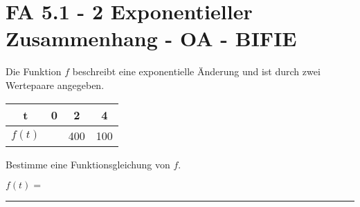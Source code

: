 \section{FA 5.1 - 2 Exponentieller Zusammenhang - OA - BIFIE}


\begin{beispiel}[FA 5.1]{1} %
Die Funktion $f$ beschreibt eine exponentielle Änderung und ist durch zwei Wertepaare angegeben. \leer

\begin{center}
\begin{tabular}{|c|c|c|c|} \hline
\cellcolor{light-gray} t & 0 & 2 & 4 \\ \hline
\cellcolor{light-gray} $f(t)$ &  & 400 & 100 \\ \hline
\end{tabular}
\end{center}

\leer

Bestimme eine Funktionsgleichung von $f$.

\leer

$f(t)=$\rule{5cm}{0.3pt}


\end{beispiel}